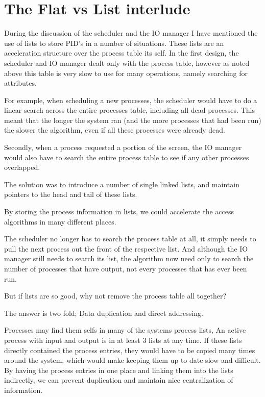 \documentclass[a4paper]{report}
\begin{document}
\section{The Flat vs List interlude}

During the discussion of the scheduler and the IO manager I have mentioned the use of lists to store PID's in a number of situations. These lists are an acceleration structure over the process table its self. In the first design, the scheduler and IO manager dealt only with the process table, however as noted above this table is very slow to use for many operations, namely searching for attributes.

For example, when scheduling a new processes, the scheduler would have to do a linear search across the entire processes table, including all dead processes. This meant that the longer the system ran (and the more processes that had been run) the slower the algorithm, even if all these processes were already dead.

Secondly, when a process requested a portion of the screen, the IO manager would also have to search the entire process table to see if any other processes overlapped.

The solution was to introduce a number of single linked lists, and maintain pointers to the head and tail of these lists.

By storing the process information in lists, we could accelerate the access algorithms in many different places.

The scheduler no longer has to search the process table at all, it simply needs to pull the next process out the front of the respective list. And although the IO manager still needs to search its list, the algorithm now need only to search the number of processes that have output, not every processes that has ever been run.

But if lists are so good, why not remove the process table all together?

The answer is two fold; Data duplication and direct addressing.

Processes may find them selfs in many of the systems process lists, An active process with input and output is in at least 3 lists at any time. If these lists directly contained the process entries, they would have to be copied many times around the system, which would make keeping them up to date slow and difficult. By having the process entries in one place and linking them into the lists indirectly, we can prevent duplication and maintain nice centralization of information.
\end{document}

